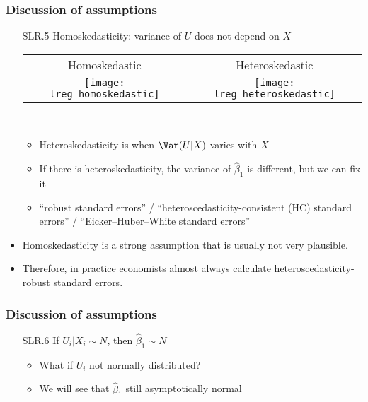 \begin{frame}[allowframebreaks]
  \frametitle{Discussion of assumptions}
  \begin{itemize}
  \item[SLR.5] Homoskedasticity: variance of $U$ does not
    depend on $X$ \\
    \begin{tabular}{cc} 
      \alert{Homoskedastic} & \alert{Heteroskedastic} \\ 
      \texttt{[image: lreg\_homoskedastic]} &
      \texttt{[image: lreg\_heteroskedastic]} 
    \end{tabular} \\
    \begin{itemize}
    \item \alert{Heteroskedasticity} is when $\Var(U|X)$ varies
      with $X$
    \item If there is heteroskedasticity, the variance of
      $\hat{\beta}_1$ is different, but we can fix it 
    \item ``robust standard errors'' / ``heteroscedasticity-consistent
      (HC) standard errors'' / ``Eicker–Huber–White standard errors''
    \end{itemize}
\item Homoskedasticity is a strong assumption that is usually not very
plausible. 
\item Therefore, in practice economists almost always calculate
heteroscedasticity-robust standard errors. 
\end{itemize}
\end{frame}


\begin{frame}[allowframebreaks]
  \frametitle{Discussion of assumptions}
  \begin{itemize}
  \item[SLR.6] If $U_i|X_i \sim N$, then $\hat{\beta}_1 \sim N$
    \begin{itemize}
    \item What if $U_i$ not normally distributed?
    \item We will see that $\hat{\beta}_1$ still asymptotically normal
    \end{itemize}
  \end{itemize}
\end{frame}


